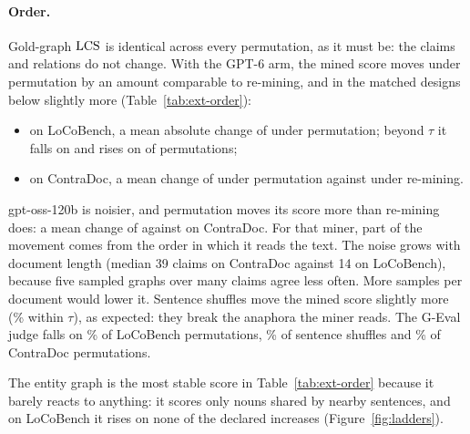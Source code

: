 \paragraph{Order.} Gold-graph $\mathrm{LCS}$ is identical across every permutation, as it must be: the
claims and relations do not change. With the GPT-6 arm, the mined score moves under permutation by an amount comparable to re-mining,
and in the matched designs below slightly more (Table~\ref{tab:ext-order}):
\begin{itemize}[leftmargin=1.2em,itemsep=1pt,topsep=2pt]
\item on LoCoBench, a mean absolute change of \extLocoPermMeanGpt{} under permutation; beyond
  $\tau$ it falls on \extLocoPermDownTolGpt{} and rises on \extLocoPermUpTolGpt{} of
  \extLocoPermNGpt{} permutations;
\item on ContraDoc, a mean change of \extCdPermMeanGpt{} under permutation against
  \extCdNoiseMeanGpt{} under re-mining.
\end{itemize}
gpt-oss-120b is noisier, and permutation moves its score more than re-mining does: a mean change
of \extCdPermMeanOss{} against \extCdNoiseMeanOss{} on ContraDoc. For that miner, part of the
movement comes from the order in which it reads the text.
The noise grows with document length (median 39 claims on ContraDoc against 14 on LoCoBench),
because five sampled graphs over many claims agree less often. More samples per document would
lower it. Sentence shuffles move the mined score slightly more (\extLocoSentInvGpt\% within
$\tau$), as expected: they break the anaphora the miner reads. The G-Eval judge falls on
\extLocoPermDecJudge\% of LoCoBench permutations, \extLocoSentDecJudge\% of sentence shuffles
and \extCdPermDecJudge\% of ContraDoc permutations.


The entity graph is the most stable score in Table~\ref{tab:ext-order} because it barely reacts to
anything: it scores only nouns shared by nearby sentences, and on LoCoBench it rises on none of the
declared increases (Figure~\ref{fig:ladders}).

